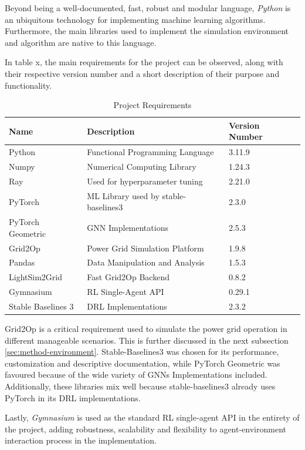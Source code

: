 Beyond being a well-documented, fast, robust and modular language, \textit{Python} is an ubiquitous technology for implementing machine learning algorithms. Furthermore, the main libraries used to implement the simulation environment and algorithm are native to this language. \par
In table x, the main requirements for the project can be observed, along with their respective version number and a short description of their purpose and functionality.
\par

\begin{table}
	\begin{tabular}{|l|l|l|}
		\hline
		\textbf{Name} & \textbf{Description} & \textbf{Version Number} \\
		\hline
		Python & Functional Programming Language & 3.11.9 \\
		\hline
		Numpy & Numerical Computing Library& 1.24.3 \\
		\hline
		Ray & Used for hyperparameter tuning & 2.21.0 \\
		\hline
		PyTorch & \acs{ML} Library used by stable-baselines3 & 2.3.0 \\
		\hline
		PyTorch Geometric & \ac{GNN} Implementations & 2.5.3 \\
		\hline
		Grid2Op & Power Grid Simulation Platform & 1.9.8 \\
		\hline
		Pandas & Data Manipulation and Analysis & 1.5.3 \\
		\hline
		LightSim2Grid & Fast Grid2Op Backend & 0.8.2 \\
		\hline
		Gymnasium & \ac{RL} Single-Agent API & 0.29.1 \\
		\hline
		Stable Baselines 3 & \ac{DRL} Implementations & 2.3.2 \\
		\hline
	\end{tabular}
	\caption{Project Requirements}
\end{table}

Grid2Op is a critical requirement used to simulate the power grid operation in different manageable scenarios. This is further discussed in the next subsection \ref{sec:method-environment}. Stable-Baselines3 was chosen for its performance, customization and descriptive documentation, while PyTorch Geometric was favoured because of the wide variety of \acp{GNN} Implementations included. Additionally, these libraries mix well because stable-baselines3 already uses PyTorch in its \ac{DRL} implementations.
\par
Lastly, \textit{Gymnasium} is used as the standard \ac{RL} single-agent API in the entirety of the project, adding robustness, scalability and flexibility to agent-environment interaction process in the implementation.  \par


